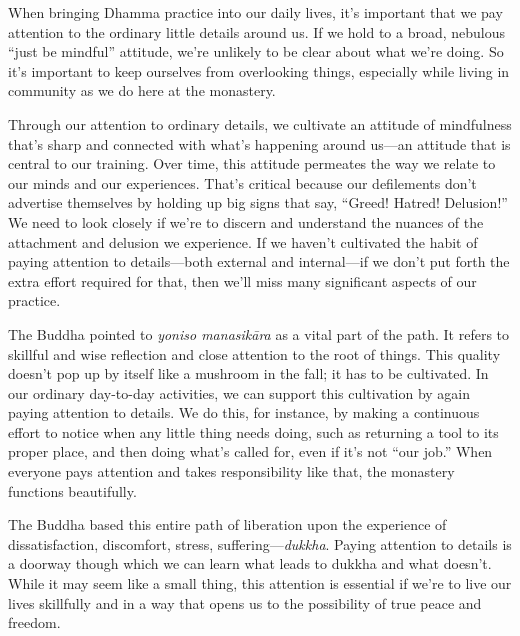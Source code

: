 
When bringing Dhamma practice into our daily lives, it's important that 
we pay attention to the ordinary little details around us. If we hold 
to a broad, nebulous ``just be mindful'' attitude, we're unlikely to be 
clear about what we're doing. So it's important to keep ourselves from 
overlooking things, especially while living in community as we do here 
at the monastery.

Through our attention to ordinary details, we cultivate an attitude of 
mindfulness that's sharp and connected with what's happening around 
us---an attitude that is central to our training. Over time, this 
attitude permeates the way we relate to our minds and our experiences. 
That's critical because our defilements don't advertise themselves by 
holding up big signs that say, ``Greed! Hatred! Delusion!'' We need to 
look closely if we're to discern and understand the nuances of the 
attachment and delusion we experience. If we haven't cultivated the 
habit of paying attention to details---both external and internal---if 
we don't put forth the extra effort required for that, then we'll miss 
many significant aspects of our practice.

The Buddha pointed to \emph{yoniso manasikāra} as a vital part of the 
path. It refers to skillful and wise reflection and close attention to 
the root of things. This quality doesn't pop up by itself like a 
mushroom in the fall; it has to be cultivated. In our ordinary 
day-to-day activities, we can support this cultivation by again paying 
attention to details. We do this, for instance, by making a continuous 
effort to notice when any little thing needs doing, such as returning a 
tool to its proper place, and then doing what's called for, even if 
it's not ``our job.'' When everyone pays attention and takes 
responsibility like that, the monastery functions beautifully.

The Buddha based this entire path of liberation upon the experience of 
dissatisfaction, discomfort, stress, suffering---\emph{dukkha}. Paying 
attention to details is a doorway though which we can learn what leads 
to dukkha and what doesn't. While it may seem like a small thing, this 
attention is essential if we're to live our lives skillfully and in a 
way that opens us to the possibility of true peace and freedom.


